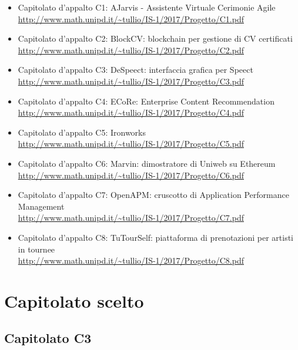 \documentclass[openany,12pt,a4paper]{report}
\begin{document}
\begin{itemize}
    \item{Capitolato d'appalto C1:} AJarvis - Assistente Virtuale Cerimonie Agile \\ \url{http://www.math.unipd.it/~tullio/IS-1/2017/Progetto/C1.pdf}
    
    \item{Capitolato d'appalto C2:} BlockCV: blockchain per gestione di CV certificati \\ \url{http://www.math.unipd.it/~tullio/IS-1/2017/Progetto/C2.pdf}
    
    \item{Capitolato d'appalto C3:} DeSpeect: interfaccia grafica per Speect \\ \url{http://www.math.unipd.it/~tullio/IS-1/2017/Progetto/C3.pdf}
    
    \item{Capitolato d'appalto C4:} ECoRe: Enterprise Content Recommendation \\ \url{http://www.math.unipd.it/~tullio/IS-1/2017/Progetto/C4.pdf}
    
    \item{Capitolato d'appalto C5:} Ironworks \\ \url{http://www.math.unipd.it/~tullio/IS-1/2017/Progetto/C5.pdf}
    
    \item{Capitolato d'appalto C6:} Marvin: dimostratore di Uniweb su Ethereum \\ \url{http://www.math.unipd.it/~tullio/IS-1/2017/Progetto/C6.pdf}
    
    \item{Capitolato d'appalto C7:} OpenAPM: cruscotto di Application Performance Management \\ \url{http://www.math.unipd.it/~tullio/IS-1/2017/Progetto/C7.pdf}
    
    \item{Capitolato d'appalto C8:} TuTourSelf: piattaforma di prenotazioni per artisti in tournee \\ \url{http://www.math.unipd.it/~tullio/IS-1/2017/Progetto/C8.pdf}
\end{itemize}


\chapter{Capitolato scelto}

\section{Capitolato C3}
\end{document}
